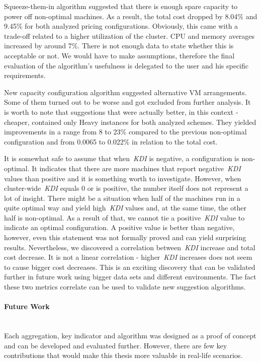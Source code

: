 \documentclass[]{final_report}
\newcommand{\myparagraph}[1]{\paragraph{#1}\mbox{}\\}
\begin{document}
Squeeze-them-in algorithm suggested that there is enough spare capacity to power off non-optimal machines. As a result, the total cost dropped by 8.04\% and 9.45\% for both analyzed pricing configurations. Obviously, this came with a trade-off related to a higher utilization of the cluster. CPU and memory averages increased by around 7\%. There is not enough data to state whether this is acceptable or not. We would have to make assumptions, therefore the final evaluation of the algorithm's usefulness is delegated to the user and his specific requirements.

New capacity configuration algorithm suggested alternative VM arrangements. Some of them turned out to be worse and got excluded from further analysis. It is worth to note that suggestions that were actually better, in this context - cheaper, contained only Heavy instances for both analyzed schemes. They yielded improvements in a range from 8 to 23\% compared to the previous non-optimal configuration and from 0.0065 to 0.022\% in relation to the total cost.

It is somewhat safe to assume that when~\textit{KDI} is negative, a configuration is non-optimal. It indicates that there are more machines that report negative~\textit{KDI} values than positive and it is something worth to investigate. However, when cluster-wide~\textit{KDI} equals 0 or is positive, the number itself does not represent a lot of insight. There might be a situation when half of the machines run in a quite optimal way and yield high~\textit{KDI} values and, at the same time, the other half is non-optimal. As a result of that, we cannot tie a positive~\textit{KDI} value to indicate an optimal configuration. A positive value is better than negative, however, even this statement was not formally proved and can yield surprising results. Nevertheless, we discovered a correlation between~\textit{KDI} increase and total cost decrease. It is not a linear correlation - higher~\textit{KDI} increases does not seem to cause bigger cost decreases. This is an exciting discovery that can be validated further in future work using bigger data sets and different environments. 
The fact these two metrics correlate can be used to validate new suggestion algorithms.

\myparagraph{Future Work}

Each aggregation, key indicator and algorithm was designed as a proof of concept and can be developed and evaluated further. However, there are few key contributions that would make this thesis more valuable in real-life scenarios.
\end{document}

